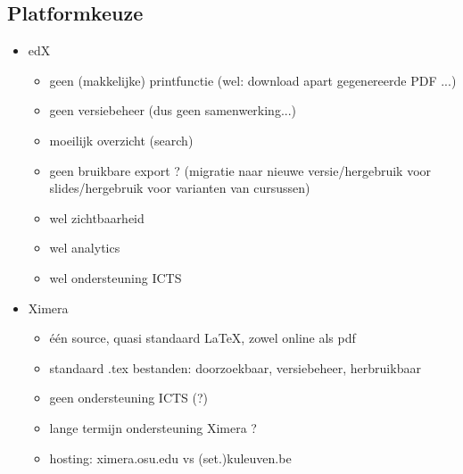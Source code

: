 \documentclass[numbers]{ximera}
\begin{document}
 \subsection{Platformkeuze}\label{platformkeuze}
\small
\begin{itemize}
    \item edX
    \begin{itemize}
        \item geen (makkelijke) printfunctie (wel: download apart gegenereerde PDF ...)
        \item geen versiebeheer (dus geen samenwerking...)
        \item moeilijk overzicht (search)
        \item geen bruikbare export ? (migratie naar nieuwe versie/hergebruik voor slides/hergebruik voor varianten van cursussen)
        \item wel zichtbaarheid
        \item wel analytics
        \item wel ondersteuning ICTS
    \end{itemize}
    \item Ximera
    \begin{itemize}
        \item één source, quasi standaard \LaTeX, zowel online als pdf
        \item standaard .tex bestanden: doorzoekbaar, versiebeheer, herbruikbaar
        \item geen ondersteuning ICTS (?)
        \item lange termijn ondersteuning Ximera ?
        \item hosting: ximera.osu.edu vs (set.)kuleuven.be
    \end{itemize}
\end{itemize}
\end{document}
